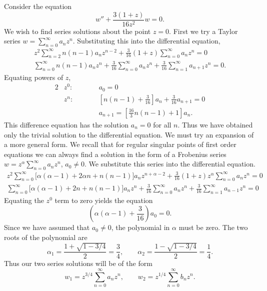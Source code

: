 \begin{Example}
  Consider the equation
  \[w'' + \frac{3(1+z)}{16z^2}w = 0.\]
  We wish to find series solutions about the point $z = 0$.  First we try
  a Taylor series $w = \sum_{n=0}^\infty a_n z^n$.
  Substituting this into the differential equation,
  \begin{gather*}
    z^2 \sum_{n=2}^\infty n(n-1)a_n z^{n-2} 
    + \frac{3}{16}(1+z) \sum_{n=0}^\infty a_n z^n = 0 \\
    \sum_{n=0}^\infty n(n-1)a_n z^n + \frac{3}{16} \sum_{n=0}^\infty a_n z^n
    + \frac{3}{16} \sum_{n=1}^\infty a_{n+1}z^n = 0.
  \end{gather*}
  Equating powers of $z$,
  \begin{alignat*}{2}
    &z^0: &\qquad &a_0 = 0 \\
    &z^n: &\qquad & \left[n(n-1) + \frac{3}{16}\right]a_n + \frac{3}{16} a_{n+1} 
    = 0 \\
    &       &       &a_{n+1} = \left[\frac{16}{3}n(n-1) + 1\right]a_n.
  \end{alignat*}
  This difference equation has the solution $a_n=0$ for all $n$.  Thus we have
  obtained only the trivial solution to the differential equation.  We must
  try an expansion of a more general form.  We recall that for regular singular
  points of first order equations we can always find a solution in the form
  of a Frobenius series $w = z^\alpha \sum_{n=0}^\infty a_n z^n$, $a_0\neq 0$.
  We substitute this series into the differential equation.
  \begin{gather*}
    z^2 \sum_{n=0}^\infty \big[\alpha(\alpha-1)+ 2 \alpha  n + n(n-1) \big] 
    a_n z^{n + \alpha - 2}
    + \frac{3}{16}(1+z)z^\alpha \sum_{n=0}^\infty a_n z^n = 0 \\
    \sum_{n=0}^\infty \big[\alpha(\alpha-1) + 2 n + n(n-1)\big]a_n z^n
    + \frac{3}{16} \sum_{n=0}^\infty a_n z^n
    + \frac{3}{16} \sum_{n=1}^\infty a_{n-1} z^n = 0 
  \end{gather*}
  Equating the $z^0$ term to zero yields the equation
  \[ \left(\alpha(\alpha-1) + \frac{3}{16}\right)a_0 = 0.\]
  Since we have assumed that $a_0\neq 0$, the polynomial in $\alpha$ must
  be zero.  The two roots of the polynomial are
  \[ \alpha_1 = \frac{1+\sqrt{1 - 3/4}}{2} = \frac{3}{4}, \qquad
  \alpha_2 = \frac{1-\sqrt{1 - 3/4}}{2} = \frac{1}{4}.\]
  Thus our two series solutions will be of the form
  \[ w_1 = z^{3/4}\sum_{n=0}^\infty a_n z^n, \qquad
  w_2 = z^{1/4}\sum_{n=0}^\infty b_n z^n.\]


\end{Example}
